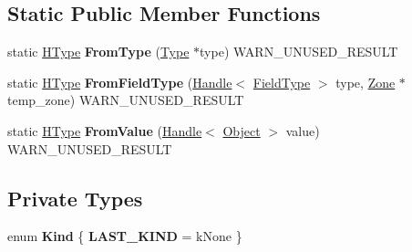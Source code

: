 \subsection*{Static Public Member Functions}
\begin{DoxyCompactItemize}
\item 
static \hyperlink{classv8_1_1internal_1_1_h_type}{H\+Type} {\bfseries From\+Type} (\hyperlink{classv8_1_1internal_1_1_type}{Type} $\ast$type) W\+A\+R\+N\+\_\+\+U\+N\+U\+S\+E\+D\+\_\+\+R\+E\+S\+U\+LT\hypertarget{classv8_1_1internal_1_1_h_type_a075bcdab8c6c3c0338a2e347d7c27c4c}{}\label{classv8_1_1internal_1_1_h_type_a075bcdab8c6c3c0338a2e347d7c27c4c}

\item 
static \hyperlink{classv8_1_1internal_1_1_h_type}{H\+Type} {\bfseries From\+Field\+Type} (\hyperlink{classv8_1_1internal_1_1_handle}{Handle}$<$ \hyperlink{classv8_1_1internal_1_1_field_type}{Field\+Type} $>$ type, \hyperlink{classv8_1_1internal_1_1_zone}{Zone} $\ast$temp\+\_\+zone) W\+A\+R\+N\+\_\+\+U\+N\+U\+S\+E\+D\+\_\+\+R\+E\+S\+U\+LT\hypertarget{classv8_1_1internal_1_1_h_type_a0c2240766dc253253e399945662a13e0}{}\label{classv8_1_1internal_1_1_h_type_a0c2240766dc253253e399945662a13e0}

\item 
static \hyperlink{classv8_1_1internal_1_1_h_type}{H\+Type} {\bfseries From\+Value} (\hyperlink{classv8_1_1internal_1_1_handle}{Handle}$<$ \hyperlink{classv8_1_1internal_1_1_object}{Object} $>$ value) W\+A\+R\+N\+\_\+\+U\+N\+U\+S\+E\+D\+\_\+\+R\+E\+S\+U\+LT\hypertarget{classv8_1_1internal_1_1_h_type_aa61b028a885987d1f70abf2f134541c3}{}\label{classv8_1_1internal_1_1_h_type_aa61b028a885987d1f70abf2f134541c3}

\end{DoxyCompactItemize}
\subsection*{Private Types}
\begin{DoxyCompactItemize}
\item 
enum {\bfseries Kind} \{ {\bfseries L\+A\+S\+T\+\_\+\+K\+I\+ND} = k\+None
 \}\hypertarget{classv8_1_1internal_1_1_h_type_a244c12e4c988587165bc4df494ffd763}{}\label{classv8_1_1internal_1_1_h_type_a244c12e4c988587165bc4df494ffd763}

\end{DoxyCompactItemize}

